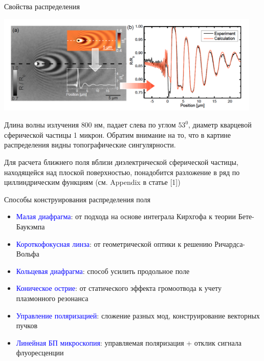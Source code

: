 \documentclass[9pt, compress, xcolor=table]{beamer}
\begin{document}
\begin{frame}{Свойства распределения}

\begin{center}
\includegraphics[width=0.95\textwidth]{near-field1}
\end{center}

Длина волны излучения $800$ нм, падает слева по углом $53^{0}$, диаметр кварцевой сферической частицы 1 микрон. Обратим внимание на то, что в картине распределения видны топографические сингулярности.

Для расчета ближнего поля вблизи диэлектрической сферической частицы, находящейся над плоской поверхностью, понадобится разложение в ряд по циллиндрическим функциям (см. Appendix в статье [1])
\end{frame}

\begin{frame}{Способы конструирования распределения поля}

\begin{itemize}
\item \textcolor{blue}{Малая диафрагма}: от подхода на основе интеграла Кирхгофа к теории Бете-Баукэмпа

\item \textcolor{blue}{Короткофокусная линза}: от геометрической оптики к решению Ричардса-Вольфа

\item \textcolor{blue}{Кольцевая диафрагма}: способ усилить продольное поле

\item \textcolor{blue}{Коническое острие}: от статического эффекта громоотвода к учету плазмонного резонанса

\item \textcolor{blue}{Управление поляризацией}: сложение разных мод, конструирование векторных пучков

\item \textcolor{blue}{Линейная БП микроскопия}: управляемая поляризация + отклик сигнала флуоресценции

\end{itemize}


\end{frame}
\end{document}

